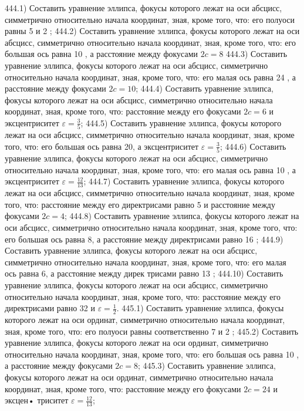 444.1) Составить уравнение эллипса, фокусы которого лежат на оси абсцисс, симметрично относительно начала координат, зная, кроме того, что: его полуоси равны 5 и 2 ;
444.2) Составить уравнение эллипса, фокусы которого лежат на оси абсцисс, симметрично относительно начала координат, зная, кроме того, что: его большая ось равна 10 , а расстояние между фокусами $2 c=8$
444.3) Составить уравнение эллипса, фокусы которого лежат на оси абсцисс, симметрично относительно начала координат, зная, кроме того, что: его малая ось равна 24 , а расстояние между фокусами $2 c=10$;
444.4) Составить уравнение эллипса, фокусы которого лежат на оси абсцисс, симметрично относительно начала координат, зная, кроме того, что: расстояние между его фокусами $2 c=6$ и эксцентриситет $\varepsilon=\frac{3}{5}$;
444.5) Составить уравнение эллипса, фокусы которого лежат на оси абсцисс, симметрично относительно начала координат, зная, кроме того, что: его большая ось равна 20, а эксцентриситет $\varepsilon=\frac{3}{5}$;
444.6) Составить уравнение эллипса, фокусы которого лежат на оси абсцисс, симметрично относительно начала координат, зная, кроме того, что: его малая ось равна 10 , а эксцентриситет $\varepsilon=\frac{12}{13}$;
444.7) Составить уравнение эллипса, фокусы которого лежат на оси абсцисс, симметрично относительно начала координат, зная, кроме того, что: расстояние между его директрисами равно 5 и расстояние между фокусами $2 c=4$;
444.8) Составить уравнение эллипса, фокусы которого лежат на оси абсцисс, симметрично относительно начала координат, зная, кроме того, что: его большая ось равна 8, а расстояние между директрисами равно 16 ;
444.9) Составить уравнение эллипса, фокусы которого лежат на оси абсцисс, симметрично относительно начала координат, зная, кроме того, что: его малая ось равна 6, а расстояние между дирек трисами равно 13 ;
444.10) Составить уравнение эллипса, фокусы которого лежат на оси абсцисс, симметрично относительно начала координат, зная, кроме того, что: расстояние между его директрисами равно 32 и $\varepsilon=\frac{1}{2}$.
445.1) Составить уравнение эллипса, фокусы которого лежат на оси ординат, симметрично относительно начала координат, зная, кроме того, что: его полуоси равны соответственно 7 и 2 ;
445.2) Составить уравнение эллипса, фокусы которого лежат на оси ординат, симметрично относительно начала координат, зная, кроме того, что: его большая ось равна 10 , а расстояние между фокусами $2 c=8$;
445.3) Составить уравнение эллипса, фокусы которого лежат на оси ординат, симметрично относительно начала координат, зная, кроме того, что: расстояние между его фокусами $2 c=24$ и эксцен• триситет $\varepsilon=\frac{12}{13}$;
